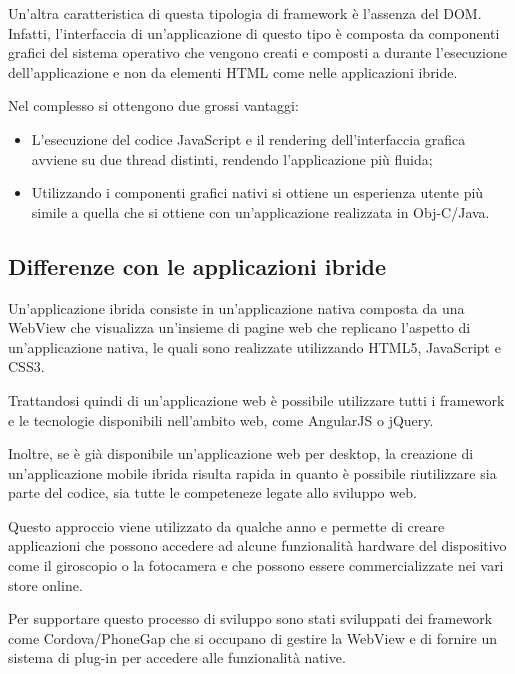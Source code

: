 Un'altra caratteristica di questa tipologia di framework è l'assenza del \gls{DOM}.
Infatti, l'interfaccia di un'applicazione di questo tipo è composta da componenti grafici del sistema operativo che vengono creati e composti a durante l'esecuzione dell'applicazione e non da elementi HTML come nelle applicazioni ibride.

Nel complesso si ottengono due grossi vantaggi:
\begin{itemize}
\item L'esecuzione del codice JavaScript e il rendering dell'interfaccia grafica avviene su due thread distinti, rendendo l'applicazione più fluida;
\item Utilizzando i componenti grafici nativi si ottiene un esperienza utente più simile a quella che si ottiene con un'applicazione realizzata in Obj-C/Java.
\end{itemize}

\subsection{Differenze con le applicazioni ibride}

Un'applicazione ibrida consiste in un'applicazione nativa composta da una \gls{WebView} che visualizza un'insieme di pagine web che replicano l'aspetto di un'applicazione nativa, le quali sono realizzate utilizzando HTML5, JavaScript e CSS3.

Trattandosi quindi di un'applicazione web è possibile utilizzare tutti i framework e le tecnologie disponibili nell'ambito web, come AngularJS o jQuery.

Inoltre, se è già disponibile un'applicazione web per desktop, la creazione di un'applicazione mobile ibrida risulta rapida in quanto è possibile riutilizzare sia parte del codice, sia tutte le competeneze legate allo sviluppo web.

Questo approccio viene utilizzato da qualche anno e permette di creare applicazioni che possono accedere ad alcune funzionalità hardware del dispositivo come il giroscopio o la fotocamera e che possono essere commercializzate nei vari store online.

Per supportare questo processo di sviluppo sono stati sviluppati dei framework come Cordova/PhoneGap che si occupano di gestire la WebView e di fornire un sistema di plug-in per accedere alle funzionalità native.

